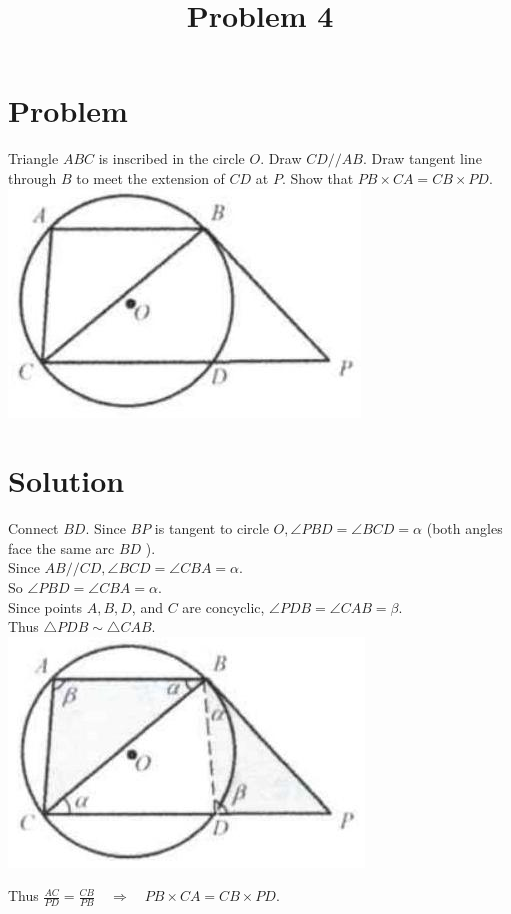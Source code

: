 \documentclass{article}
\title{Problem 4}
\date{}
\begin{document}
\maketitle

\section*{Problem}
Triangle \(A B C\) is inscribed in the circle \(O\). Draw \(C D / / A B\). Draw tangent line through \(B\) to meet the extension of \(C D\) at \(P\). Show that \(P B \times C A=C B \times P D\).\\
\centering
\includegraphics[width=\textwidth]{images/problem_image_1.jpg}

\section*{Solution}
Connect \(B D\). Since \(B P\) is tangent to circle \(O, \angle P B D=\angle B C D=\alpha\) (both angles face the same arc \(B D\) ).\\
Since \(A B / / C D, \angle B C D=\angle C B A=\alpha\).\\
So \(\angle P B D=\angle C B A=\alpha\).\\
Since points \(A, B, D\), and \(C\) are concyclic, \(\angle P D B=\angle C A B=\beta\).\\
Thus \(\triangle P D B \sim \triangle C A B\).\\
\centering
\includegraphics[width=\textwidth]{images/reasoning_image_1.jpg}

Thus \(\frac{A C}{P D}=\frac{C B}{P B} \quad \Rightarrow \quad P B \times C A=C B \times P D\).
\end{document}
